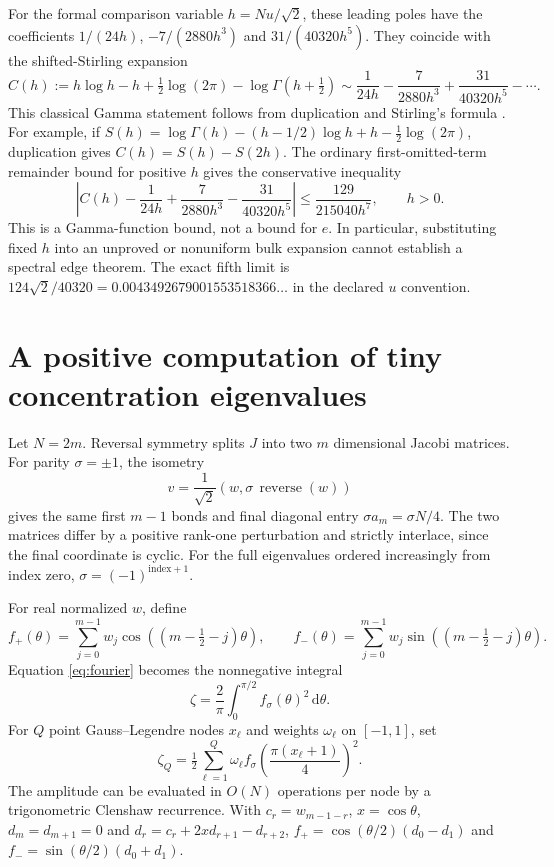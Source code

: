 \documentclass[10pt]{article}
\newcommand{\dd}{\mathrm d}
\begin{document}
For the formal comparison variable $h=Nu/\sqrt2$, these leading poles have the coefficients
$1/(24h)$, $-7/(2880h^3)$ and $31/(40320h^5)$. They coincide with the shifted-Stirling expansion
\begin{equation}
 C(h):=h\log h-h+\tfrac12\log(2\pi)-\log\Gamma(h+\tfrac12)
 \sim\frac1{24h}-\frac7{2880h^3}+\frac{31}{40320h^5}-\cdots.
 \label{eq:gamma}
\end{equation}
This classical Gamma statement follows from duplication and Stirling's formula \cite{duplication,stirling}. For example, if
$S(h)=\log\Gamma(h)-(h-1/2)\log h+h-\tfrac12\log(2\pi)$,
duplication gives $C(h)=S(h)-S(2h)$. The ordinary first-omitted-term remainder bound for positive $h$ gives the conservative inequality
\begin{equation}
 \left|C(h)-\frac1{24h}+\frac7{2880h^3}-\frac{31}{40320h^5}\right|
 \le\frac{129}{215040h^7},\qquad h>0.
 \label{eq:gammaerror}
\end{equation}
This is a Gamma-function bound, not a bound for $e$. In particular, substituting fixed $h$ into an unproved or nonuniform bulk expansion cannot establish a spectral edge theorem. The exact fifth limit is
$124\sqrt2/40320=0.0043492679001553518366\ldots$ in the declared $u$ convention.

\section{A positive computation of tiny concentration eigenvalues}
Let $N=2m$. Reversal symmetry splits $J$ into two $m$ dimensional Jacobi matrices. For parity $\sigma=\pm1$, the isometry
\begin{equation}
 v=\frac1{\sqrt2}(w,\sigma\,\operatorname{reverse}(w))
 \label{eq:parity}
\end{equation}
gives the same first $m-1$ bonds and final diagonal entry $\sigma a_m=\sigma N/4$. The two matrices differ by a positive rank-one perturbation and strictly interlace, since the final coordinate is cyclic. For the full eigenvalues ordered increasingly from index zero, $\sigma=(-1)^{\text{index}+1}$.

For real normalized $w$, define
\[
 f_+(\theta)=\sum_{j=0}^{m-1}w_j\cos((m-\tfrac12-j)\theta),\qquad
 f_-(\theta)=\sum_{j=0}^{m-1}w_j\sin((m-\tfrac12-j)\theta).
\]
Equation \eqref{eq:fourier} becomes the nonnegative integral
\begin{equation}
 \zeta=\frac2\pi\int_0^{\pi/2}f_\sigma(\theta)^2\,\dd\theta.
 \label{eq:positive}
\end{equation}
For $Q$ point Gauss--Legendre nodes $x_\ell$ and weights $\omega_\ell$ on $[-1,1]$, set
\begin{equation}
 \zeta_Q=\tfrac12\sum_{\ell=1}^Q\omega_\ell
 f_\sigma\!\left(\frac{\pi(x_\ell+1)}4\right)^2.
 \label{eq:quad}
\end{equation}
The amplitude can be evaluated in $O(N)$ operations per node by a trigonometric Clenshaw recurrence. With $c_r=w_{m-1-r}$, $x=\cos\theta$, $d_m=d_{m+1}=0$ and $d_r=c_r+2xd_{r+1}-d_{r+2}$,
$f_+=\cos(\theta/2)(d_0-d_1)$ and $f_-=\sin(\theta/2)(d_0+d_1)$.
\end{document}
